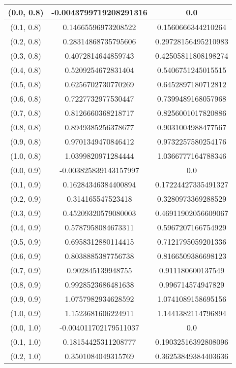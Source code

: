 \begin{table}[H]
\begin{tabular}{|c|c|c|}
\hline
(0.0, 0.8) & -0.0043799719208291316 & 0.0 \\
\hline
(0.1, 0.8) & 0.14665596973208522 & 0.1560666344210264 \\
\hline
(0.2, 0.8) & 0.28314868735795606 & 0.29728156495210983 \\
\hline
(0.3, 0.8) & 0.4072814644859743 & 0.42505811808198274 \\
\hline
(0.4, 0.8) & 0.5209254672831404 & 0.5406751245015515 \\
\hline
(0.5, 0.8) & 0.6256702730770269 & 0.6452897180712812 \\
\hline
(0.6, 0.8) & 0.7227732977530447 & 0.7399489168057968 \\
\hline
(0.7, 0.8) & 0.8126660368218717 & 0.8256001017820886 \\
\hline
(0.8, 0.8) & 0.8949385256378677 & 0.9031004988477567 \\
\hline
(0.9, 0.8) & 0.9701349470846412 & 0.9732257580254176 \\
\hline
(1.0, 0.8) & 1.0399820971284444 & 1.0366777164788346 \\
\hline
\hline
(0.0, 0.9) & -0.003825839143157997 & 0.0 \\
\hline
(0.1, 0.9) & 0.16284346384400894 & 0.17224427335491327 \\
\hline
(0.2, 0.9) & 0.314165547523418 & 0.3280973369288529 \\
\hline
(0.3, 0.9) & 0.45209320579080003 & 0.46911902056609067 \\
\hline
(0.4, 0.9) & 0.5787958084673311 & 0.5967207166754929 \\
\hline
(0.5, 0.9) & 0.6958312880114415 & 0.7121795059201336 \\
\hline
(0.6, 0.9) & 0.8038885387756738 & 0.8166509386698123 \\
\hline
(0.7, 0.9) & 0.902845139948755 & 0.911180600137549 \\
\hline
(0.8, 0.9) & 0.9928523686481638 & 0.996714574947829 \\
\hline
(0.9, 0.9) & 1.0757982934628592 & 1.0741089158695156 \\
\hline
(1.0, 0.9) & 1.1523681606224911 & 1.1441382114796894 \\
\hline
\hline
(0.0, 1.0) & -0.004011702179511037 & 0.0 \\
\hline
(0.1, 1.0) & 0.18154425311208777 & 0.19032516392808096 \\
\hline
(0.2, 1.0) & 0.3501084049315769 & 0.36253849384403636 \\

\end{tabular}
\end{table}
